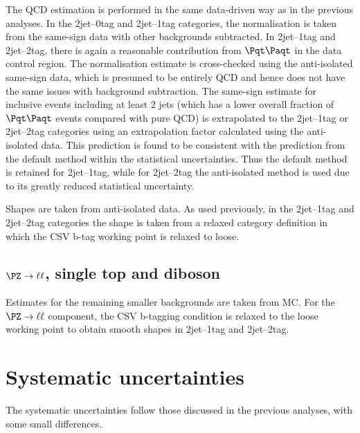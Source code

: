 The QCD estimation is performed in the same data-driven way as in the previous
analyses. In the 2jet--0tag and 2jet--1tag categories, the normalisation is
taken from the same-sign data with other backgrounds subtracted. In 2jet--1tag
and 2jet--2tag, there is again a reasonable contribution from $\ttbar$ in the
data control region. The normalisation estimate is cross-checked using the anti-isolated
same-sign data, which is presumed to be entirely QCD and hence does not have the
same issues with background subtraction. The same-sign estimate for inclusive
events including at least 2 jets (which has a lower overall fraction of $\ttbar$
events compared with pure QCD) is extrapolated to the 2jet--1tag or 2jet--2tag
categories using an extrapolation factor calculated using the anti-isolated
data. This prediction is found to be consistent with the prediction from the
default method within the statistical uncertainties. Thus the default method is
retained for 2jet--1tag, while for 2jet--2tag the anti-isolated method is
used due to its greatly reduced statistical uncertainty. 

Shapes are taken from anti-isolated data. As used previously, in the 2jet--1tag
and 2jet--2tag categories the shape is taken from a relaxed category definition
in which the \ac{CSV} b-tag working point is relaxed to loose.

\subsection{$\PZ\to\ell\ell$, single top and diboson}

Estimates for the remaining smaller backgrounds are taken from \ac{MC}. For the
$\PZ\to\ell\ell$ component, the \ac{CSV} b-tagging condition is relaxed to the
loose working point to obtain smooth shapes in 2jet--1tag and 2jet--2tag.

\section{Systematic uncertainties}
\label{sec:Hhhsystematics}

The systematic uncertainties follow those discussed in the previous analyses,
with some small differences. 

